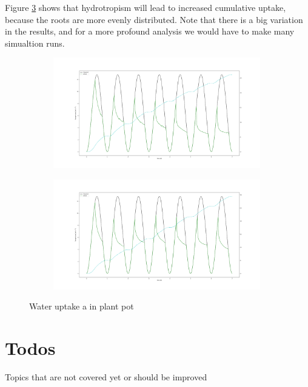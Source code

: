 Figure \ref{fig:example7c} shows that hydrotropism will lead to increased cumulative uptake, because the roots are more evenly distributed. Note that there is a big variation in the results, and for a more profound analysis we would have to make many simualtion runs. 

\begin{figure}
\begin{subfigure}[c]{0.5\textwidth}
\includegraphics[width=0.99\textwidth]{example7c_no_hydro.png}
 \label{fig:example7c}
\end{subfigure}
\begin{subfigure}[c]{0.5\textwidth}
\includegraphics[width=0.99\textwidth]{example7c_simple_hydro.png}
 \label{fig:example7c_hydro}
\end{subfigure}
\caption{Water uptake a in plant pot} \label{fig:example7c}
\end{figure}







\newpage
\section{Todos}
Topics that are not covered yet or should be improved

